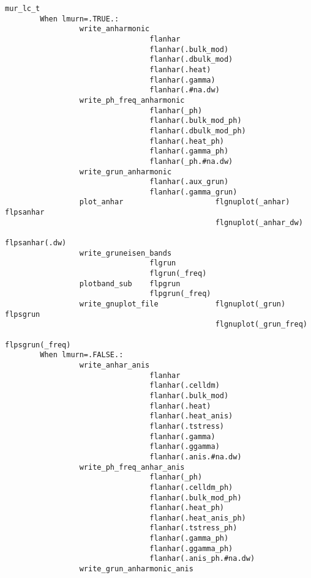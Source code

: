 \documentclass[12pt,a4paper]{article}
\begin{document}
\begin{verbatim}
mur_lc_t        
        When lmurn=.TRUE.: 
                 write_anharmonic
                                 flanhar
                                 flanhar(.bulk_mod)
                                 flanhar(.dbulk_mod)
                                 flanhar(.heat)
                                 flanhar(.gamma)
                                 flanhar(.#na.dw)
                 write_ph_freq_anharmonic
                                 flanhar(_ph)
                                 flanhar(.bulk_mod_ph)
                                 flanhar(.dbulk_mod_ph)
                                 flanhar(.heat_ph)
                                 flanhar(.gamma_ph)
                                 flanhar(_ph.#na.dw)
                 write_grun_anharmonic
                                 flanhar(.aux_grun)
                                 flanhar(.gamma_grun)
                 plot_anhar                     flgnuplot(_anhar)  flpsanhar
                                                flgnuplot(_anhar_dw) 
                                                            flpsanhar(.dw)
                 write_gruneisen_bands
                                 flgrun
                                 flgrun(_freq)
                 plotband_sub    flpgrun
                                 flpgrun(_freq)
                 write_gnuplot_file             flgnuplot(_grun)    flpsgrun
                                                flgnuplot(_grun_freq) 
                                                                 flpsgrun(_freq)
        When lmurn=.FALSE.:
                 write_anhar_anis
                                 flanhar
                                 flanhar(.celldm)
                                 flanhar(.bulk_mod)
                                 flanhar(.heat)
                                 flanhar(.heat_anis)
                                 flanhar(.tstress)
                                 flanhar(.gamma)
                                 flanhar(.ggamma)
                                 flanhar(.anis.#na.dw)
                 write_ph_freq_anhar_anis
                                 flanhar(_ph)
                                 flanhar(.celldm_ph)
                                 flanhar(.bulk_mod_ph)
                                 flanhar(.heat_ph)
                                 flanhar(.heat_anis_ph)
                                 flanhar(.tstress_ph)
                                 flanhar(.gamma_ph)
                                 flanhar(.ggamma_ph)
                                 flanhar(.anis_ph.#na.dw)
                 write_grun_anharmonic_anis

\end{verbatim}
\end{document}
